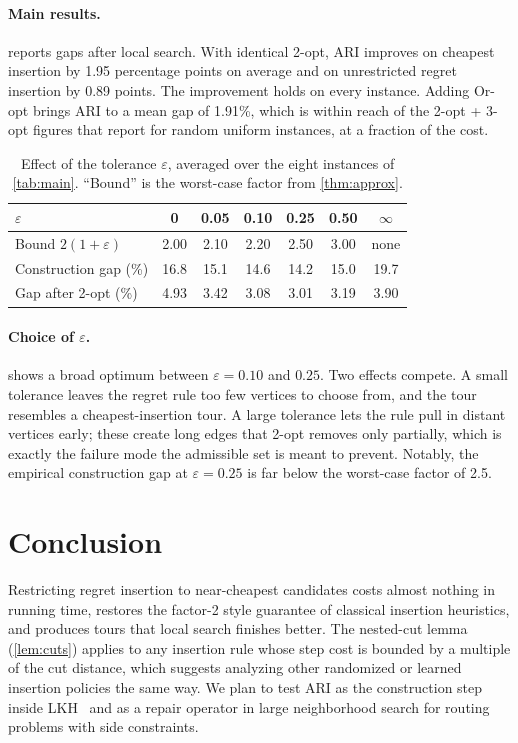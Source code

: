 \documentclass[11pt]{article}
\theoremstyle{definition}
\theoremstyle{remark}
\begin{document}
\paragraph{Main results.}  reports gaps after local search. With identical 2-opt, ARI improves on cheapest insertion by 1.95 percentage points on average and on unrestricted regret insertion by 0.89 points. The improvement holds on every instance. Adding Or-opt brings ARI to a mean gap of 1.91\%, which is within reach of the 2-opt + 3-opt figures that \citet{johnson1997} report for random uniform instances, at a fraction of the cost.

\begin{table}[t]
\centering
\caption{Effect of the tolerance $\varepsilon$, averaged over the eight instances of \cref{tab:main}. ``Bound'' is the worst-case factor from \cref{thm:approx}.}
\label{tab:eps}
\begin{tabular}{@{}lcccccc@{}}
\toprule
$\varepsilon$ & 0 & 0.05 & 0.10 & 0.25 & 0.50 & $\infty$ \\
\midrule
Bound $2(1+\varepsilon)$          & 2.00  & 2.10  & 2.20  & 2.50  & 3.00  & none  \\
Construction gap (\%)             & 16.8  & 15.1  & 14.6  & 14.2  & 15.0  & 19.7  \\
Gap after 2-opt (\%)              & 4.93  & 3.42  & 3.08  & 3.01  & 3.19  & 3.90  \\
\bottomrule
\end{tabular}
\end{table}

\paragraph{Choice of $\varepsilon$.}  shows a broad optimum between $\varepsilon = 0.10$ and $0.25$. Two effects compete. A small tolerance leaves the regret rule too few vertices to choose from, and the tour resembles a cheapest-insertion tour. A large tolerance lets the rule pull in distant vertices early; these create long edges that 2-opt removes only partially, which is exactly the failure mode the admissible set is meant to prevent. Notably, the empirical construction gap at $\varepsilon = 0.25$ is far below the worst-case factor of 2.5.

\section{Conclusion}
\label{sec:conclusion}

Restricting regret insertion to near-cheapest candidates costs almost nothing in running time, restores the factor-2 style guarantee of classical insertion heuristics, and produces tours that local search finishes better. The nested-cut lemma (\cref{lem:cuts}) applies to any insertion rule whose step cost is bounded by a multiple of the cut distance, which suggests analyzing other randomized or learned insertion policies the same way. We plan to test ARI as the construction step inside LKH~\cite{helsgaun2000} and as a repair operator in large neighborhood search for routing problems with side constraints.



\end{document}
